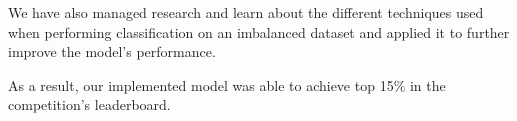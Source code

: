 \documentclass[sigconf,nonacm=true]{acmart}
\begin{document}
We have also managed research and learn about the different techniques used when performing classification on an imbalanced
dataset and applied it to further improve the model's performance.

As a result, our implemented model was able to achieve top 15\% in the competition's leaderboard.





\end{document}
